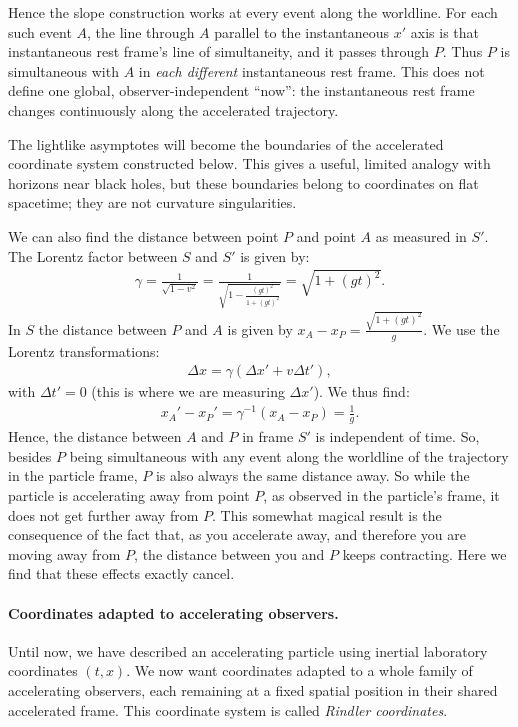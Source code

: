 \documentclass[12pt]{article}
\newcommand{\be}{\begin{eqnarray}}
\newcommand{\ee}{\end{eqnarray}}
\begin{document}
Hence the slope construction works at every event along the worldline. For each such event $A$, the line through $A$ parallel to the instantaneous $x'$ axis is that instantaneous rest frame's line of simultaneity, and it passes through $P$. Thus $P$ is simultaneous with $A$ in \emph{each different} instantaneous rest frame. This does not define one global, observer-independent ``now'': the instantaneous rest frame changes continuously along the accelerated trajectory.

The lightlike asymptotes will become the boundaries of the accelerated coordinate system constructed below. This gives a useful, limited analogy with horizons near black holes, but these boundaries belong to coordinates on flat spacetime; they are not curvature singularities.

We can also find the distance between point $P$ and point $A$ as measured in $S'$. The Lorentz factor between $S$ and $S'$ is given by:
\be
\gamma = \frac{1}{\sqrt{1-v^2}} = \frac{1}{\sqrt{1-\frac{(gt)^2}{1+(gt)^2}}} = \sqrt{1+(gt)^2}.
\ee
In $S$ the distance between $P$ and $A$ is given by $x_A-x_P = \frac{\sqrt{1+(gt)^2}}{g}$. We use the Lorentz transformations:
\be
\Delta x = \gamma(\Delta x' + v \Delta t'),
\ee
with $\Delta t' = 0$ (this is where we are measuring $\Delta x'$). We thus find:
\be
x_A' - x_P' = \gamma^{-1}(x_A - x_P) = \frac{1}{g} \label{eq:distance}. 
\ee
Hence, the distance between $A$ and $P$ in frame $S'$ is independent of time. So, besides $P$ being simultaneous with any event along the worldline of the trajectory in the particle frame, $P$ is also always the same distance away. So while the particle is accelerating away from point $P$, as observed in the particle's frame, it does not get further away from $P$. This somewhat magical result is the consequence of the fact that, as you accelerate away, and therefore you are moving away from $P$, the distance between you and $P$ keeps contracting. Here we find that these effects exactly cancel.

\paragraph{Coordinates adapted to accelerating observers.}
Until now, we have described an accelerating particle using inertial laboratory coordinates $(t,x)$. We now want coordinates adapted to a whole family of accelerating observers, each remaining at a fixed spatial position in their shared accelerated frame. This coordinate system is called \emph{Rindler coordinates}.
\end{document}
